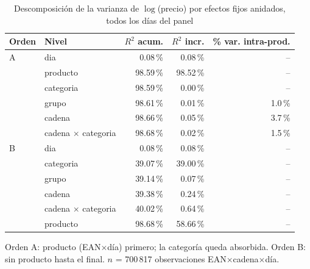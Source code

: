 \begin{table}[htbp]
\caption{Descomposici\'on de la varianza de $\log$(precio) por efectos fijos anidados, todos los d\'ias del panel}
\label{tab:varianza}
\centering\scriptsize\setlength{\tabcolsep}{3pt}
\begin{tabular}{@{}llrrr@{}}
\toprule
Orden & Nivel & $R^2$ acum. & $R^2$ incr. & \% var. intra-prod. \\
\midrule
A & dia & 0.08\,\% & 0.08\,\% & -- \\
 & producto & 98.59\,\% & 98.52\,\% & -- \\
 & categoria & 98.59\,\% & 0.00\,\% & -- \\
 & grupo & 98.61\,\% & 0.01\,\% & 1.0\,\% \\
 & cadena & 98.66\,\% & 0.05\,\% & 3.7\,\% \\
 & cadena $\times$ categoria & 98.68\,\% & 0.02\,\% & 1.5\,\% \\
\midrule
B & dia & 0.08\,\% & 0.08\,\% & -- \\
 & categoria & 39.07\,\% & 39.00\,\% & -- \\
 & grupo & 39.14\,\% & 0.07\,\% & -- \\
 & cadena & 39.38\,\% & 0.24\,\% & -- \\
 & cadena $\times$ categoria & 40.02\,\% & 0.64\,\% & -- \\
 & producto & 98.68\,\% & 58.66\,\% & -- \\
\bottomrule\end{tabular}
\par\smallskip\raggedright\scriptsize Orden A: producto (EAN$\times$d\'ia) primero; la categor\'ia queda absorbida. Orden B: sin producto hasta el final. $n$ = 700\,817 observaciones EAN$\times$cadena$\times$d\'ia.
\end{table}
